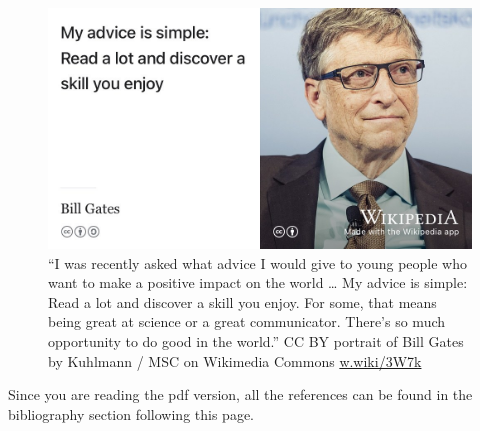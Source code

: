 \documentclass[
]{book}
\begin{document}
\begin{figure}

{\centering \includegraphics[width=1\linewidth]{images/bill-gates} 

}

\caption{``I was recently asked what advice I would give to young people who want to make a positive impact on the world \ldots{} My advice is simple: Read a lot and discover a skill you enjoy. For some, that means being great at science or a great communicator. There's so much opportunity to do good in the world.'' \citep{gatesread} CC BY portrait of Bill Gates by Kuhlmann / MSC on Wikimedia Commons \href{https://w.wiki/3W7k}{w.wiki/3W7k}}\label{fig:billgates-fig}
\end{figure}



Since you are reading the pdf version, all the references can be found in the bibliography section following this page.

  
\end{document}
